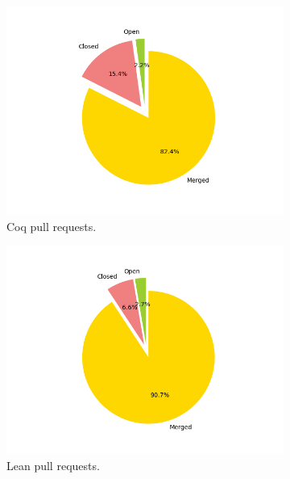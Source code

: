 \documentclass[sigconf,nonacm]{acmart}
\begin{document}
\begin{figure}[H]
  \begin{subfigure}{0.45\columnwidth}
    \includegraphics[width=\linewidth]{coq_prs_sate.png}
    \caption{Coq pull requests.}
    \label{coq prs}
  \end{subfigure}
  \hfill %
  \begin{subfigure}{0.45\columnwidth}
    \includegraphics[width=\linewidth]{Lean_pull_requests_state.png}
    \caption{Lean pull requests.}
    \label{lean prs}
  \end{subfigure}
  \begin{subfigure}{0.45\columnwidth}

\end{subfigure}
\end{figure}
\end{document}
